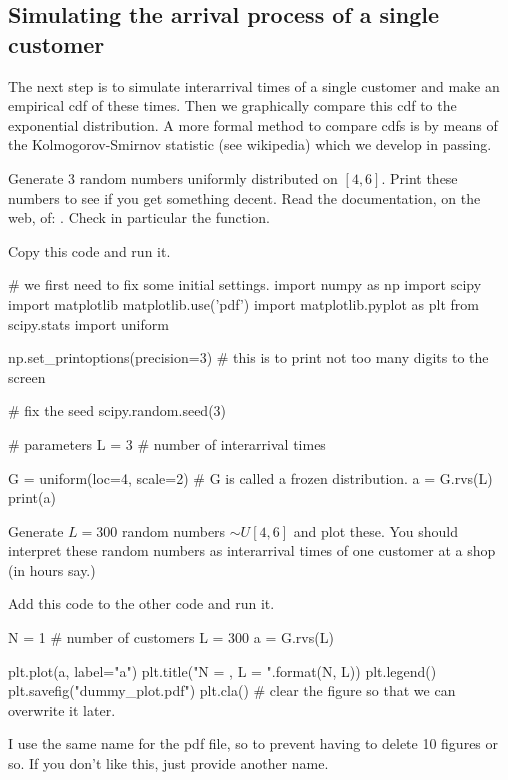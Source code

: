 \documentclass{scrartcl}
\begin{document}
\subsection{Simulating the arrival process of a single customer}
\label{sec:simulations}

The next step is to simulate interarrival times of a single customer and  make an empirical cdf of these times.  Then we graphically compare this cdf to the exponential distribution. A more formal method to compare cdfs is by means of the Kolmogorov-Smirnov statistic (see wikipedia) which we develop in passing.

\begin{exercise}
  Generate 3 random numbers uniformly distributed on $[4,6]$.  Print these numbers to see if you get something decent. Read the documentation, on the web, of:
 .  Check in particular the  function. 

\begin{solution}
Copy this code and run it.
\begin{pyverbatim}
# we first need to fix some initial settings.
import numpy as np
import scipy
import matplotlib
matplotlib.use('pdf') 
import matplotlib.pyplot as plt
from scipy.stats import uniform

np.set_printoptions(precision=3) # this is to print not too many digits to the screen

# fix the seed
scipy.random.seed(3) 

# parameters
L = 3  # number of interarrival times

G = uniform(loc=4, scale=2) # G is called a frozen distribution.
a = G.rvs(L)
print(a)
\end{pyverbatim}
  
\end{solution}

\end{exercise}


\begin{exercise}
Generate $L=300$ random numbers $\sim U[4,6]$ and plot these. You should interpret these random numbers as interarrival times of one customer at a shop (in hours say.)
\begin{solution}
Add this code to the other code and run it.
\begin{pyverbatim}
N = 1 # number of customers
L = 300
a = G.rvs(L)

plt.plot(a, label="a")
plt.title("N = {}, L = {}".format(N, L))
plt.legend()
plt.savefig("dummy_plot.pdf")
plt.cla() # clear the figure so that we can overwrite it later.
\end{pyverbatim}
I use the same name for the pdf file, so to prevent having to delete 10 figures or so. If you don't like this, just provide another name. 
\end{solution}
\end{exercise}
\end{document}
